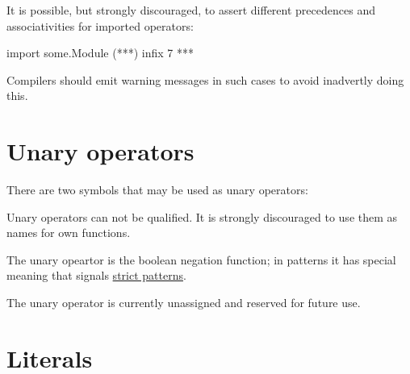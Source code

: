 \begin{flushleft}
   \oder{}   
\end{flushleft}

It is possible, but strongly discouraged, to assert different precedences and associativities for imported operators:

\begin{code}
import some.Module (***)
infix 7 ***
\end{code}

Compilers should emit warning messages in such cases to avoid inadvertly doing this.


\section{Unary operators}

There are two symbols that may be used as unary operators:

\begin{flushleft}
 \sym{!} \oder{} 
\end{flushleft}

Unary operators can not be qualified. It is strongly discouraged to use them as names for own functions.

The unary opeartor \sym{!} is the boolean negation function; in patterns it has special meaning that signals  \hyperref[strictpats]{strict patterns}.

The unary operator  is currently unassigned and reserved for future use. 

\section{Literals}

